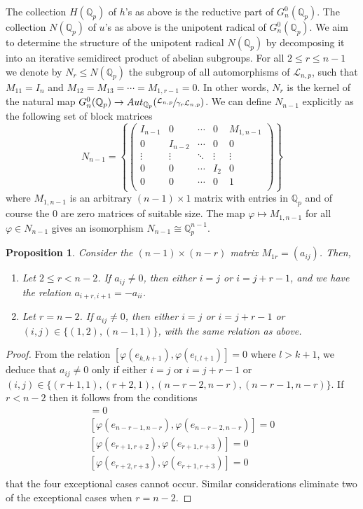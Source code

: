 \documentclass[12pt]{article}
\newtheorem{proposition}[theorem]{Proposition}
\begin{document}
The collection $H(\mathbb{Q}_{p})$ of $h$'s as above is the reductive part of $G_{n}^{0}(\mathbb{Q}_{p})$. The collection $N(\mathbb{Q}_{p})$ of $u$'s as above is the unipotent radical of $G_{n}^{0}(\mathbb{Q}_{p})$. We aim to determine the structure of the unipotent radical $N(\mathbb{Q}_p)$ by decomposing it into an iterative semidirect product of abelian subgroups.
For all $2\leq{r}\leq{n-1}$ we denote by $N_{r}\leq{N(\mathbb{Q}_{p})}$ the subgroup of all automorphisms of $\mathcal{L}_{n,p}$, such that $M_{11}=I_{n}$ and $M_{12}=M_{13}=\cdots=M_{1,r-1}=0$. In other words, $N_{r}$ is the kernel of the natural map $G_{n}^{0}(\mathbb{Q}_{p})\rightarrow{Aut_{\mathbb{Q}_{p}}(\sfrac{\mathcal{L}_{n,p}}{\gamma_{r}\mathcal{L}_{n,p}})}$. We can define $N_{n-1}$ explicitly as the following set of block matrices \[
N_{n-1}=\left\{\begin{pmatrix}
I_{n-1} & 0 & \cdots & 0 & M_{1,n-1}\\
0 & I_{n-2} & \cdots & 0 & 0\\
\vdots & \vdots & \ddots & \vdots & \vdots\\
0 & 0 & \cdots & I_{2} & 0\\
0 & 0 & \cdots & 0 & 1\\
\end{pmatrix}\right\}
\]
where $M_{1,n-1}$ is an arbitrary $(n-1)\times{1}$ matrix with entries in $\mathbb{Q}_{p}$ and of course the $0$ are zero matrices of suitable size. The map $\varphi\mapsto{M_{1,n-1}}$ for all $\varphi\in{N_{n-1}}$ gives an isomorphism $N_{n-1}\cong\mathbb{Q}_{p}^{n-1}$.
\begin{proposition}
\label{block.1r.structure}
Consider the $(n-1)\times{(n-r)}$ matrix $M_{1r}=(a_{ij})$. Then,
\begin{enumerate}
    \item Let $2\leq{r}<{n-2}$. If $a_{ij}\neq{0}$, then either $i=j$ or $i=j+r-1$, and we have the relation $a_{i+r,i+1}=-a_{ii}$.
    \item Let $r=n-2$. If $a_{ij}\neq{0}$, then either $i=j$ or $i=j+r-1$ or $(i,j)\in\{(1,2),(n-1,1)\}$, with the same relation as above.
\end{enumerate}
\end{proposition}
\begin{proof}
From the relation $[\varphi(e_{k,k+1}),\varphi(e_{l,l+1})]=0$ where $l>k+1$, we deduce that $a_{ij}\neq{0}$ only if either $i=j$ or $i=j+r-1$ or $(i,j)\in\{(r+1,1),(r+2,1),(n-r-2,n-r),(n-r-1,n-r)\}$. If $r<n-2$ then it follows from the conditions
\begin{align*}
[\varphi(e_{n-r-2,n-r-1}),\varphi(e_{n-r-2,n-r})]=0\\
[\varphi(e_{n-r-1,n-r}),\varphi(e_{n-r-2,n-r})]=0\\
[\varphi(e_{r+1,r+2}),\varphi(e_{r+1,r+3})]=0\\
[\varphi(e_{r+2,r+3}),\varphi(e_{r+1,r+3})]=0\\
\end{align*}
that the four exceptional cases cannot occur. Similar considerations eliminate two of the exceptional cases when $r=n-2$.
\end{proof}
\end{document}
